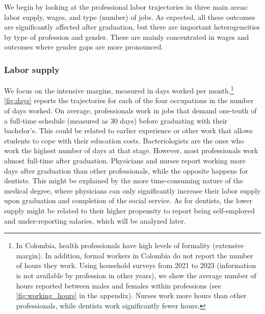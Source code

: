 \documentclass[12pt, a4paper]{article}
\begin{document}
We begin by looking at the professional labor trajectories in three main areas: labor supply, wages, and type (number) of jobs. As expected, all these outcomes are significantly affected after graduation, but there are important heterogeneities by type of profession and gender. These are mainly concentrated in wages and outcomes where gender gaps are more pronounced.

\subsubsection{Labor supply}

We focus on the intensive margins, measured in days worked per month.\footnote{In Colombia, health professionals have high levels of formality (extensive margin). In addition, formal workers in Colombia do not report the number of hours they work. Using household surveys from 2021 to 2023 (information is not available by profession in other years), we show the average number of hours reported between males and females within professions (see \autoref{fig:working_hours} in the appendix). Nurses work more hours than other professionals, while dentists work significantly fewer hours.} \autoref{fig:days} reports the trajectories for each of the four occupations in the number of days worked. On average, professionals work in jobs that demand one-tenth of a full-time schedule (measured as 30 days) before graduating with their bachelor's. This could be related to earlier experience or other work that allows students to cope with their education costs. Bacteriologists are the ones who work the highest number of days at that stage. However, most professionals work almost full-time after graduation. Physicians and nurses report working more days after graduation than other professionals, while the opposite happens for dentists. This might be explained by the more time-consuming nature of the medical degree, where physicians can only significantly increase their labor supply upon graduation and completion of the social service. As for dentists, the lower supply might be related to their higher propensity to report being self-employed and under-reporting salaries, which will be analyzed later.
\end{document}
